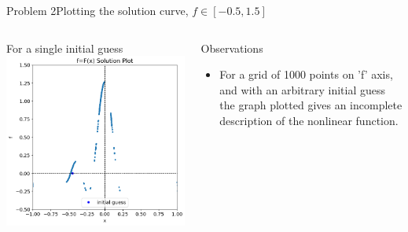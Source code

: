 \documentclass{beamer}
\begin{document}
\begin{frame}{Problem 2}{Plotting the solution curve, $f\in[-0.5,1.5]$}
    \vspace{-2.5em}
    \begin{columns}
        \begin{block}{\scriptsize For a single initial guess}
            \includegraphics[width=\textwidth]{Figures/prob2_pltsol1.png}
        \end{block}
        \begin{block}{\footnotesize Observations }
            \footnotesize
            \begin{itemize}
                \item For a grid of 1000 points on 'f' axis, and with an arbitrary initial guess the graph plotted gives an incomplete description of the nonlinear function.
            \end{itemize}
        \end{block}
    \end{columns}
\end{frame}
\end{document}
